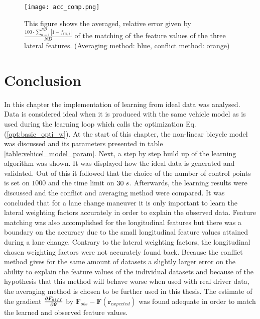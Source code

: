 \begin{figure}[h!]
	\centering
	\texttt{[image: acc\_comp.png]}
	\caption{This figure shows the averaged, relative error given by $\frac{100\cdot\sum_{n=1}^{ND}|1-f_{rel,i}|}{ND}$ of the matching of the feature values of the three lateral features. (Averaging method: blue, conflict method: orange)}
	\label{fig:acc_comp}
\end{figure}

\newpage
 \section{Conclusion} \label{s:conclusion_cha4}
In this chapter the implementation of learning from ideal data was analysed. Data is considered ideal when it is produced with the same vehicle model as is used during the learning loop which calls the optimization Eq. (\ref{opt:basic_opti_w}). At the start of this chapter, the non-linear bicycle model was discussed and its parameters presented in table \ref{table:vehicel_model_param}. Next, a step by step build up of the learning algorithm was shown. It was displayed how the ideal data is generated and validated. Out of this it followed that the choice of the number of control points is set on $1000$ and the time limit on $30 \hspace{1mm}s$. Afterwards, the learning results were discussed and the conflict and averaging method were compared. It was concluded that for a lane change maneuver it is only important to learn the lateral weighting factors accurately in order to explain the observed data. Feature matching was also accomplished for the longitudinal features but there was a boundary on the accuracy due to the small longitudinal feature values attained during a lane change. Contrary to the lateral weighting factors, the longitudinal chosen weighting factors were not accurately found back. Because the conflict method gives for the same amount of datasets a slightly larger error on the ability to explain the feature values of the individual datasets and because of the hypothesis that this method will behave worse when used with real driver data, the averaging method is chosen to be further used in this thesis. The estimate of the gradient $\pdv{\bm{F}_{diff}}{\bm{\theta}}$ by $\bm{F}_{obs} - \bm{F}(\bm{r}_{expected})$ was found adequate in order to match the learned and observed feature values.




